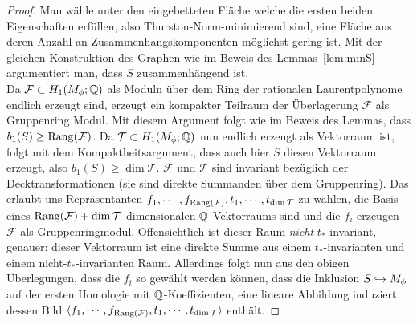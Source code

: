     \begin{proof}
        Man wähle unter den eingebetteten Fläche welche die ersten beiden Eigenschaften erfüllen, also Thurston-Norm-minimierend sind, eine Fläche aus deren Anzahl an Zusammenhangskomponenten möglichst gering ist. Mit der gleichen Konstruktion des Graphen wie im Beweis des Lemmas~\ref{lem:minS} argumentiert man, dass $S$ zusammenhängend ist.\\
        Da $\mathcal F \subset H_1(M_\phi;\mathbb{Q})$ als Moduln über dem Ring der rationalen Laurentpolynome endlich erzeugt sind, erzeugt ein kompakter Teilraum der Überlagerung $\mathcal F$ als Gruppenring Modul. Mit diesem Argument folgt wie im Beweis des Lemmas, dass $b_1(S)\geq \operatorname{Rang}(\mathcal F)$. Da $\mathcal T \subset H_1(M_\phi;\mathbb{Q})$ nun endlich erzeugt als Vektorraum ist, folgt mit dem Kompaktheitsargument, dass auch hier $S$ diesen Vektorraum erzeugt, also $b_1(S)\geq \dim \mathcal T$. $\mathcal F$ und $\mathcal T$ sind invariant bezüglich der Decktransformationen (sie sind direkte Summanden über dem Gruppenring). Das erlaubt uns Repräsentanten $f_1,\cdots,f_{\operatorname{Rang}(\mathcal F)},t_1,\cdots,t_{\dim\mathcal T}$ zu wählen, die Basis eines $\operatorname{Rang}(\mathcal F)+\dim\mathcal T$-dimensionalen $\mathbb{Q}$-Vektorraums sind und die $f_i$ erzeugen $\mathcal F$ als Gruppenringmodul. Offensichtlich ist dieser Raum \emph{nicht} $t_*$-invariant, genauer: dieser Vektorraum ist eine direkte Summe aus einem $t_*$-invarianten und einem nicht-$t_*$-invarianten Raum. Allerdings folgt nun aus den obigen Überlegungen, dass die $f_i$ so gewählt werden können, dass die Inklusion $S\hookrightarrow M_\phi$ auf der ersten Homologie mit $\mathbb{Q}$-Koeffizienten, eine lineare Abbildung induziert dessen Bild $\langle f_1,\cdots,f_{\operatorname{Rang}(\mathcal F)},t_1,\cdots,t_{\dim\mathcal T} \rangle$ enthält.
    \end{proof}

